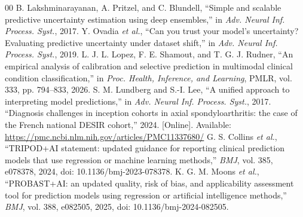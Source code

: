 \documentclass[conference]{IEEEtran}
\begin{document}
\begin{thebibliography}{00}
 B. Lakshminarayanan, A. Pritzel, and C. Blundell, ``Simple and scalable predictive uncertainty estimation using deep ensembles,'' in \emph{Adv. Neural Inf. Process. Syst.}, 2017.
 Y. Ovadia \emph{et al.}, ``Can you trust your model's uncertainty? Evaluating predictive uncertainty under dataset shift,'' in \emph{Adv. Neural Inf. Process. Syst.}, 2019.
 L. J. L. Lopez, F. E. Shamout, and T. G. J. Rudner, ``An empirical analysis of calibration and selective prediction in multimodal clinical condition classification,'' in \emph{Proc. Health, Inference, and Learning}, PMLR, vol. 333, pp. 794--833, 2026.
 S. M. Lundberg and S.-I. Lee, ``A unified approach to interpreting model predictions,'' in \emph{Adv. Neural Inf. Process. Syst.}, 2017.
 ``Diagnosis challenges in inception cohorts in axial spondyloarthritis: the case of the French national DESIR cohort,'' 2024. [Online]. Available: \url{https://pmc.ncbi.nlm.nih.gov/articles/PMC11337680/}
 G. S. Collins \emph{et al.}, ``TRIPOD+AI statement: updated guidance for reporting clinical prediction models that use regression or machine learning methods,'' \emph{BMJ}, vol. 385, e078378, 2024, doi: 10.1136/bmj-2023-078378.
 K. G. M. Moons \emph{et al.}, ``PROBAST+AI: an updated quality, risk of bias, and applicability assessment tool for prediction models using regression or artificial intelligence methods,'' \emph{BMJ}, vol. 388, e082505, 2025, doi: 10.1136/bmj-2024-082505.
\end{thebibliography}
\end{document}
